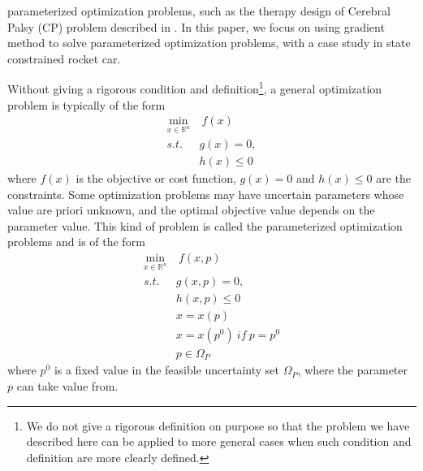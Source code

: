 	
	parameterized optimization problems, such as the therapy design of Cerebral Palsy (CP) problem described in \cite{MatSch22}. In this paper, we focus on using gradient method to solve parameterized optimization problems, with a case study in state constrained rocket car. 
	
	Without giving a rigorous condition and definition\footnote{We do not give a rigorous definition on purpose so that the problem we have described here can be applied to more general cases when such condition and definition are more clearly defined.},  a general optimization problem is typically of the form
	\begin{equation}
		\begin{aligned}
			\underset{x \in \mathbb{R}^n}{\text{min}}  & 	\   f(x) \\
			s.t.  \  \  \ & g(x) = 0, \\ 
			&  h(x)  \leq  0 
		\end{aligned}
		\label{GeneralMin}
	\end{equation}
	where $f(x)$ is the objective or cost function, $g(x) = 0$ and $h(x)  \leq  0$ are the constraints. Some optimization problems may have uncertain parameters whose value are priori unknown, and the optimal objective value depends on the parameter value. This kind of problem is called the parameterized optimization problems and is of the form 
	\begin{equation}
		\begin{aligned}
			\underset{x \in \mathbb{R}^n}{\text{min}}  & 	\    f(x, p) \\
			s.t.  \  \  \ & g(x, p) = 0, \\ 
			&  h(x,p)  \leq  0  \\ 
			& x = x(p) \\
			& x = x(p^0) \  if \  p = p^0 \\
			& p \in \Omega_P		
		\end{aligned}
		\label{ParaMin}
	\end{equation}
	where $p^0$ is a fixed value in the feasible uncertainty set $\Omega_P$, where the parameter $p$ can take value from.
	

